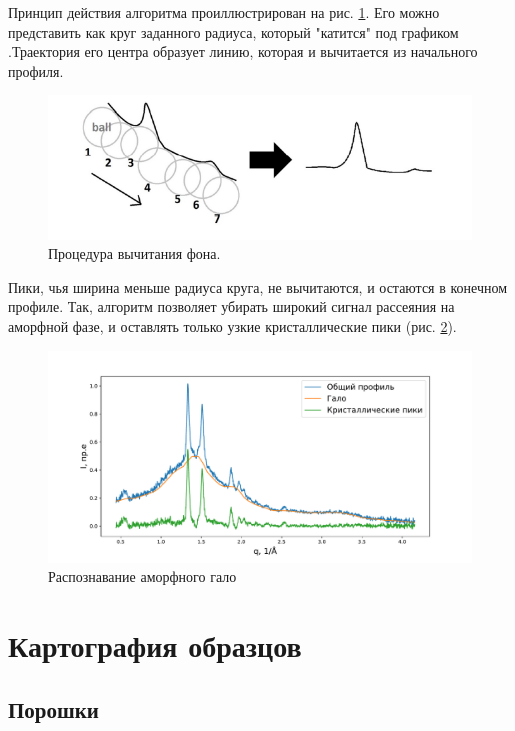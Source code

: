 	Принцип действия алгоритма проиллюстрирован на рис. \ref{fig:ball}. 
	Его можно представить как круг заданного радиуса, который "катится"  под графиком \cite{ball2018}.Траектория его центра образует линию, которая и вычитается из начального профиля. 
		\begin{figure}[ht]
	    \centering
	    \includegraphics[width=\linewidth]{fig/ball.PNG}
	    \caption{Процедура вычитания фона.}
	    \label{fig:ball}
	\end{figure}

	
	Пики, чья ширина меньше радиуса круга, не вычитаются, и остаются в конечном профиле. Так, алгоритм позволяет убирать широкий сигнал рассеяния  на аморфной фазе, и оставлять только узкие кристаллические пики (рис. \ref{fig:ball-profile}).
	
	
	\begin{figure}[ht]
	    \centering
	    \includegraphics[width=\linewidth]{fig/ball-profile.pdf}
	    \caption{Распознавание аморфного гало}
	    \label{fig:ball-profile}
	\end{figure}



\section{Картография образцов}

\subsection{Порошки}

